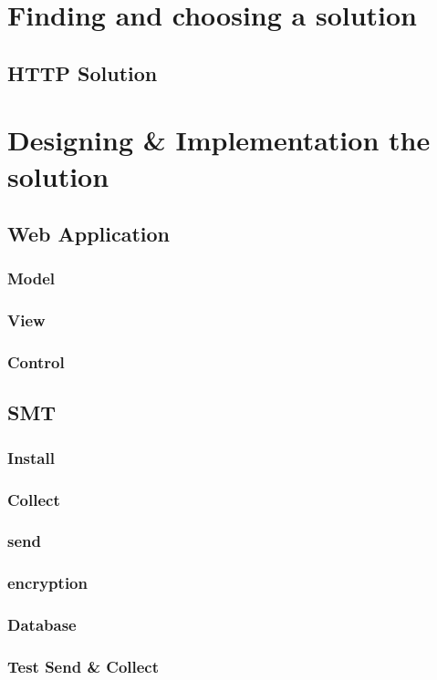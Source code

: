 \documentclass[11pt]{article}
\begin{document}
\section{Finding and choosing a solution}
\subsection{HTTP Solution}
\section{Designing \& Implementation the solution}
\subsection{Web Application}
\subsubsection{Model}
\subsubsection{View}
\subsubsection{Control}
\subsection{SMT}
\subsubsection{Install}
\subsubsection{Collect}
\subsubsection{send}
\subsubsection{encryption}
\subsubsection{Database}
\subsubsection{Test Send \& Collect}
\end{document}
